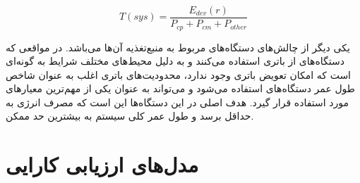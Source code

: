 \documentclass[a4paper]{article}
\begin{document}
\begin{equation}
    T(sys) = \frac{E_{dev}(r)}{P_{cp} + P_{cm} + P_{other}}
\end{equation}

یکی دیگر از چالش‌های دستگاه‌های  مربوط به منبع‌تغذیه آن‌ها می‌باشد. در
مواقعی که دستگاه‌های  از باتری استفاده می‌کنند و به دلیل محیط‌های مختلف
شرایط به گونه‌ای است که امکان تعویض باتری وجود ندارد، محدودیت‌های باتری اغلب به
عنوان شاخص طول عمر دستگاه‌های  استفاده می‌شود و می‌تواند به عنوان یکی از
مهم‌ترین معیار‌های  مورد استفاده قرار گیرد. هدف اصلی در این دستگاه‌ها
این است که مصرف انرژی به حداقل برسد و طول عمر کلی سیستم به بیشترین حد ممکن.

\section{مدل‌های ارزیابی کارایی}

\newpage


\end{document}
